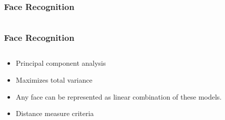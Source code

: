 \documentclass[aspectratio=149]{beamer}
\begin{document}

\begin{frame}
\frametitle{Face Recognition}
\begin{columns}
	\begin{column}{.35\textwidth}
		
	\end{column}
	\begin{column}{.35\textwidth}
		
	\end{column}
	\begin{column}{.35\textwidth}
		
	\end{column}
\end{columns} 
\end{frame}


\begin{frame}
\frametitle{Face Recognition}
\begin{columns}
	\begin{column}{.35\textwidth}
		\begin{itemize}
			\item Principal component analysis
			\item Maximizes total variance
			\item Any face can be represented as linear combination of these models.
			\item Distance measure criteria
		\end{itemize}
	\end{column}
	\begin{column}{.35\textwidth}
		
	\end{column}
	\begin{column}{.35\textwidth}
		
	\end{column}
\end{columns} 

\end{frame}
\end{document}
